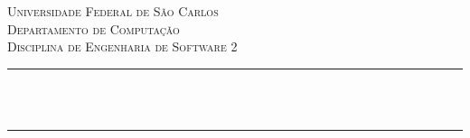 \begin{titlepage}
    \newcommand{\HRule}{\rule{\linewidth}{0.5mm}}
    \center
    
    \textsc{\LARGE Universidade Federal de São Carlos}\\[0.5cm]
    \textsc{\Large Departamento de Computação}\\[2cm]
    \textsc{\Large Disciplina de Engenharia de Software 2}\\[5cm]
    
    \makeatletter
    \HRule \\[0.4cm]
    { \huge \textbf \@title}\\[0.4cm]
    \HRule \\[3cm]
    

    {\Large \@author}\\[5cm]
    {\Large \@date}\\[2cm]
    \vfill
\end{titlepage}
